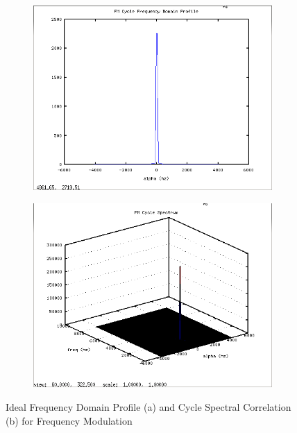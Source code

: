 \begin{figure}
\centering
\begin{subfigure}{.49\textwidth}
\centering
\includegraphics[width=\linewidth]{../img/Report_FM_Ia_Ideal.png}
  \caption{ }
\end{subfigure}
\begin{subfigure}{.49\textwidth}
  \centering
  \includegraphics[width=\linewidth]{../img/Report_FM_Sxa_Ideal.png}
  \caption{ }
\end{subfigure}
\caption{Ideal Frequency Domain Profile (a) and Cycle Spectral Correlation (b)
for Frequency Modulation}
\label{fig:IdealFMCyclo}
\end{figure}


